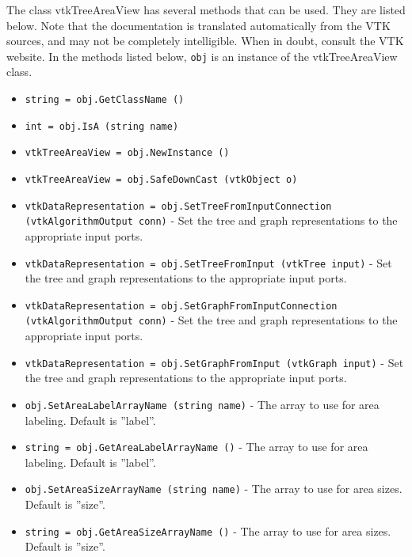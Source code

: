 The class vtkTreeAreaView has several methods that can be used.
  They are listed below.
Note that the documentation is translated automatically from the VTK sources,
and may not be completely intelligible.  When in doubt, consult the VTK website.
In the methods listed below, \verb|obj| is an instance of the vtkTreeAreaView class.
\begin{itemize}
\item  \verb|string = obj.GetClassName ()|

\item  \verb|int = obj.IsA (string name)|

\item  \verb|vtkTreeAreaView = obj.NewInstance ()|

\item  \verb|vtkTreeAreaView = obj.SafeDownCast (vtkObject o)|

\item  \verb|vtkDataRepresentation = obj.SetTreeFromInputConnection (vtkAlgorithmOutput conn)| -  Set the tree and graph representations to the appropriate input ports.

\item  \verb|vtkDataRepresentation = obj.SetTreeFromInput (vtkTree input)| -  Set the tree and graph representations to the appropriate input ports.

\item  \verb|vtkDataRepresentation = obj.SetGraphFromInputConnection (vtkAlgorithmOutput conn)| -  Set the tree and graph representations to the appropriate input ports.

\item  \verb|vtkDataRepresentation = obj.SetGraphFromInput (vtkGraph input)| -  Set the tree and graph representations to the appropriate input ports.

\item  \verb|obj.SetAreaLabelArrayName (string name)| -  The array to use for area labeling.  Default is ''label''.

\item  \verb|string = obj.GetAreaLabelArrayName ()| -  The array to use for area labeling.  Default is ''label''.

\item  \verb|obj.SetAreaSizeArrayName (string name)| -  The array to use for area sizes. Default is ''size''.

\item  \verb|string = obj.GetAreaSizeArrayName ()| -  The array to use for area sizes. Default is ''size''.


\end{itemize}
